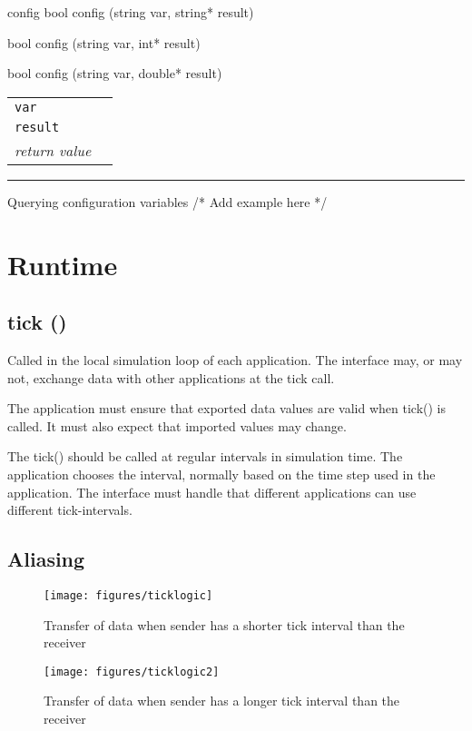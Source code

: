 \documentclass[a4paper]{report}
\makeatletter
\newenvironment{parameters}%
{\begin{tabular}{@{\hspace{2em}}lp{0.6\textwidth}}}%
{\end{tabular}\par\vspace{1mm}\par\hrule\par\vspace{5mm}}
\makeatother
\begin{document}
\begin{head}{config}
  bool config (string var, string* result)

  bool config (string var, int* result)

  bool config (string var, double* result)
\end{head}
\begin{parameters}
  \lstinline|var| & \\
  \lstinline|result| & \\
  \emph{return value} & \\
\end{parameters}

\begin{code}{Querying configuration variables}
  /* Add example here */
\end{code}

\section{Runtime}

\subsection{tick ()}

Called in the local simulation loop of each application.
The interface may, or may not, exchange data with other applications
at the tick call.

The application must ensure that exported data values are valid when
tick() is called.  It must also expect that imported values may change.

The tick() should be called at regular intervals in simulation time.
The application chooses the interval, normally based on the time step
used in the application.  The interface must handle that different
applications can use different tick-intervals.


\subsection{Aliasing}

\begin{figure}
  \begin{center}
    \begin{minipage}{0.45\textwidth}
      \texttt{[image: figures/ticklogic]}
      \caption{Transfer of data when sender has a shorter
        tick interval than the receiver}
    \end{minipage}
    \hfill
    \begin{minipage}{0.45\textwidth}
      \texttt{[image: figures/ticklogic2]}
      \caption{Transfer of data when sender has a longer
        tick interval than the receiver}
    \end{minipage}
  \end{center}
\end{figure}
\end{document}
